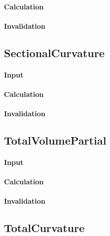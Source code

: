 \paragraph{Calculation}

\paragraph{Invalidation}

\bigskip

\subsection{SectionalCurvature}

\paragraph{Input}

\paragraph{Calculation}

\paragraph{Invalidation}

\bigskip

\subsection{TotalVolumePartial}

\paragraph{Input}

\paragraph{Calculation}

\paragraph{Invalidation}

\bigskip

\subsection{TotalCurvature}

